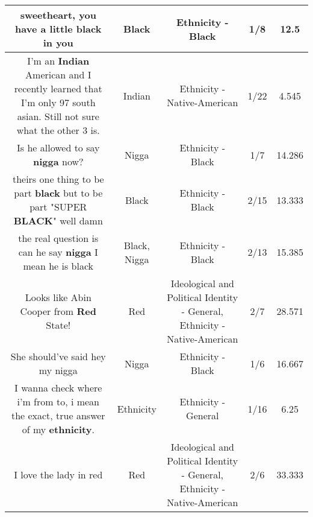 \documentclass[11pt]{article}
\newlength\mylength
\begin{document}
\begin{center}
\begin{longtable}{|C{.65\mylength}|C{.30\mylength}|C{.12\mylength}|C{.12\mylength}|C{.12\mylength}|}
  \small sweetheart, you have a little \textbf{black} in you\normalsize   & Black & Ethnicity - Black & 1/8 & 12.5 \\  \hline
  \small I'm an \textbf{Indian} American and I recently learned that I'm only 97 south asian. Still not sure what the other 3 is.\normalsize   & Indian & Ethnicity - Native-American & 1/22 & 4.545 \\  \hline
  \small Is he allowed to say \textbf{nigga} now?\normalsize   & Nigga & Ethnicity - Black & 1/7 & 14.286 \\  \hline
  \small theirs one thing to be part \textbf{black} but to be part "SUPER \textbf{BLACK}" well damn\normalsize   & Black & Ethnicity - Black & 2/15 & 13.333 \\  \hline
  \small the real question is can he say \textbf{nigga} I mean he is black\normalsize   & Black, Nigga & Ethnicity - Black & 2/13 & 15.385 \\  \hline
  \small Looks like Abin Cooper from \textbf{R\textbf{ed}} State!\normalsize   & Red &  Ideological and Political Identity - General, Ethnicity - Native-American & 2/7 & 28.571 \\  \hline
  \small She should've said hey my nigga\normalsize   & Nigga & Ethnicity - Black & 1/6 & 16.667 \\  \hline
  \small I wanna check where i'm from to, i mean the exact, true answer of my \textbf{ethnicity}.\normalsize   & Ethnicity & Ethnicity - General & 1/16 & 6.25 \\  \hline
  \small I love the lady in red\normalsize   & Red &  Ideological and Political Identity - General, Ethnicity - Native-American & 2/6 & 33.333 \\  \hline

\end{longtable}
\end{center}
\end{document}
